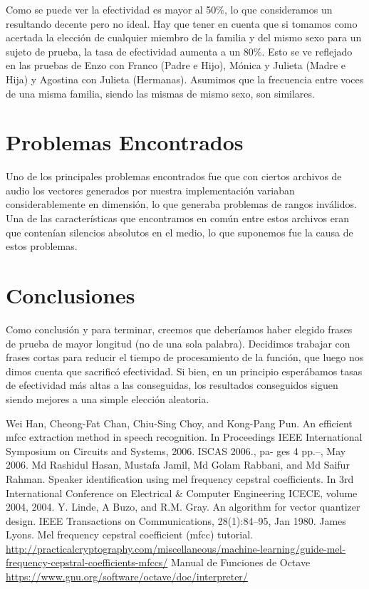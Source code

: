 \documentclass[a4paper,10pt]{article}
\begin{document}
Como se puede ver la efectividad es mayor al 50\%, lo que consideramos un resultando decente pero no ideal. Hay que tener en cuenta que si tomamos como acertada la elección de cualquier miembro de la familia y del mismo sexo para un sujeto de prueba, la tasa de efectividad aumenta a un 80\%. Esto se ve reflejado en las pruebas de Enzo con Franco (Padre e Hijo), Mónica y Julieta (Madre e Hija) y Agostina con Julieta (Hermanas). Asumimos que la frecuencia entre voces de una misma familia, siendo las mismas de mismo sexo, son similares.

\section{Problemas Encontrados}
Uno de los principales problemas encontrados fue que con ciertos archivos de audio los vectores generados por nuestra implementación variaban considerablemente en dimensión, lo que generaba problemas de rangos inválidos. Una de las características que encontramos en común entre estos archivos eran que contenían silencios absolutos en el medio, lo que suponemos fue la causa de estos problemas.

\section{Conclusiones}
Como conclusión y para terminar, creemos que deberíamos haber elegido frases de prueba de mayor longitud (no de una sola palabra). Decidimos trabajar con frases cortas para reducir el tiempo de procesamiento de la función, que luego nos dimos cuenta que sacrificó efectividad. Si bien, en un principio esperábamos tasas de efectividad más altas a las conseguidas, los resultados conseguidos siguen siendo mejores a una simple elección aleatoria.

\begin{thebibliography}{9}
 Wei Han, Cheong-Fat Chan, Chiu-Sing Choy, and Kong-Pang Pun. An efficient mfcc extraction method in speech recognition. In Proceedings IEEE International Symposium on Circuits and Systems, 2006. ISCAS 2006., pa- ges 4 pp.–, May 2006.
 Md Rashidul Hasan, Mustafa Jamil, Md Golam Rabbani, and Md Saifur Rahman. Speaker identification using mel frequency cepstral coefficients. In 3rd International Conference on Electrical \& Computer Engineering ICECE, volume 2004, 2004.
 Y. Linde, A Buzo, and R.M. Gray. An algorithm for vector quantizer design. IEEE Transactions on Communications, 28(1):84–95, Jan 1980.
\bibitem{} James Lyons. Mel frequency cepstral coefficient (mfcc) tutorial. 
\url{http://practicalcryptography.com/miscellaneous/machine-learning/guide-mel-frequency-cepstral-coefficients-mfccs/}
\bibitem{} Manual de Funciones de Octave \url{https://www.gnu.org/software/octave/doc/interpreter/}
\end{thebibliography}
\end{document}

